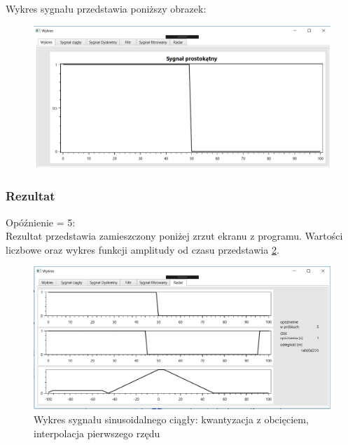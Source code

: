 \documentclass[12pt]{article}
\begin{document}
Wykres sygnału przedstawia poniższy obrazek:
\begin{figure}[h!]
 \centering
 \includegraphics[width=12.3cm]{prost.PNG}
 \vspace{-0.3cm}
 \label{gw}
\end{figure}
\subsubsection{Rezultat}

Opóźnienie = 5:
\\Rezultat przedstawia zamieszczony poniżej zrzut ekranu z programu. Wartości liczbowe oraz wykres funkcji amplitudy od czasu przedstawia \ref{Wykres dla wynikw eksperymentu pierwszego}.
\begin{figure}[h!]
 \centering
 \includegraphics[width=12.3cm]{prostR5.PNG}
 \vspace{-0.3cm}
 \caption{Wykres sygnału sinusoidalnego ciągły: kwantyzacja z obcięciem, interpolacja pierwszego rzędu}
 \label{Wykres dla wynikw eksperymentu pierwszego}
\end{figure}
\end{document}
